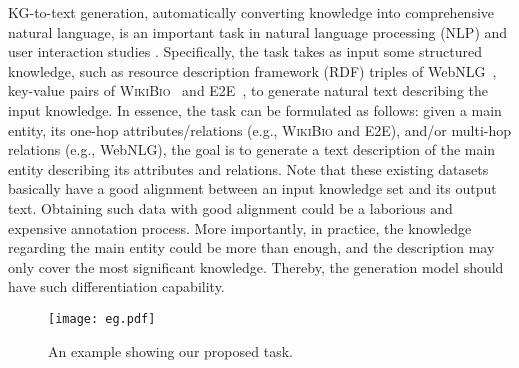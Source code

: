\documentclass[11pt,a4paper]{article}
\begin{document}
KG-to-text generation, automatically converting knowledge into comprehensive natural language, is an important task in natural language processing (NLP) and user interaction studies \cite{damljanovic2010natural}.
Specifically, the task takes as input some structured knowledge, such as resource description framework (RDF) triples of WebNLG~\cite{gardent2017webnlg}, key-value pairs of  W\textsc{iki}B\textsc{io}~\cite{lebret2016neural} and E2E~\cite{novikova2017e2e}, to generate natural text describing the input knowledge.
In essence, the task can be formulated as follows: given a main entity, its one-hop attributes/relations (e.g., W\textsc{iki}B\textsc{io} and E2E), and/or multi-hop relations (e.g., WebNLG), the goal is to generate a text description of the main entity describing its attributes and relations.
Note that these existing datasets basically have a good alignment between an input knowledge set and its output text. Obtaining such data with good alignment could be a laborious and expensive annotation process. 
More importantly, in practice, the knowledge regarding the main entity could be more than enough, and the description may only cover the most significant knowledge. Thereby, the generation model should have such differentiation capability.






\begin{figure}[t!]
    \begin{center}
    \leavevmode
    \texttt{[image: eg.pdf]}
\caption{\label{eg} An example showing our proposed task.}
\end{center}
\end{figure}
\end{document}
